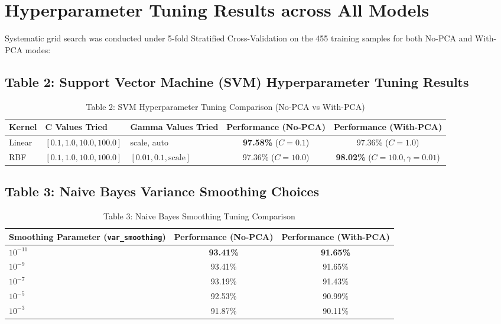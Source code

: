 \documentclass[12pt,a4paper]{article}
\begin{document}
\section{Hyperparameter Tuning Results across All Models}

Systematic grid search was conducted under 5-fold Stratified Cross-Validation on the 455 training samples for both No-PCA and With-PCA modes:

\subsection*{Table 2: Support Vector Machine (SVM) Hyperparameter Tuning Results}
\begin{table}[H]
\centering
\begin{tabular}{|l|l|l|c|c|}
\hline
\textbf{Kernel} & \textbf{C Values Tried} & \textbf{Gamma Values Tried} & \textbf{Performance (No-PCA)} & \textbf{Performance (With-PCA)} \\ \hline
Linear & $[0.1, 1.0, 10.0, 100.0]$ & scale, auto & \textbf{97.58\%} ($C=0.1$) & 97.36\% ($C=1.0$) \\ \hline
RBF & $[0.1, 1.0, 10.0, 100.0]$ & $[0.01, 0.1, \text{scale}]$ & 97.36\% ($C=10.0$) & \textbf{98.02\%} ($C=10.0, \gamma=0.01$) \\ \hline
\end{tabular}
\caption{Table 2: SVM Hyperparameter Tuning Comparison (No-PCA vs With-PCA)}
\label{tab:exp7_svm_tuning}
\end{table}

\subsection*{Table 3: Naive Bayes Variance Smoothing Choices}
\begin{table}[H]
\centering
\begin{tabular}{|l|c|c|}
\hline
\textbf{Smoothing Parameter (\texttt{var\_smoothing})} & \textbf{Performance (No-PCA)} & \textbf{Performance (With-PCA)} \\ \hline
$10^{-11}$ & \textbf{93.41\%} & \textbf{91.65\%} \\ \hline
$10^{-9}$ & 93.41\% & 91.65\% \\ \hline
$10^{-7}$ & 93.19\% & 91.43\% \\ \hline
$10^{-5}$ & 92.53\% & 90.99\% \\ \hline
$10^{-3}$ & 91.87\% & 90.11\% \\ \hline
\end{tabular}
\caption{Table 3: Naive Bayes Smoothing Tuning Comparison}
\label{tab:exp7_nb_tuning}
\end{table}
\end{document}
